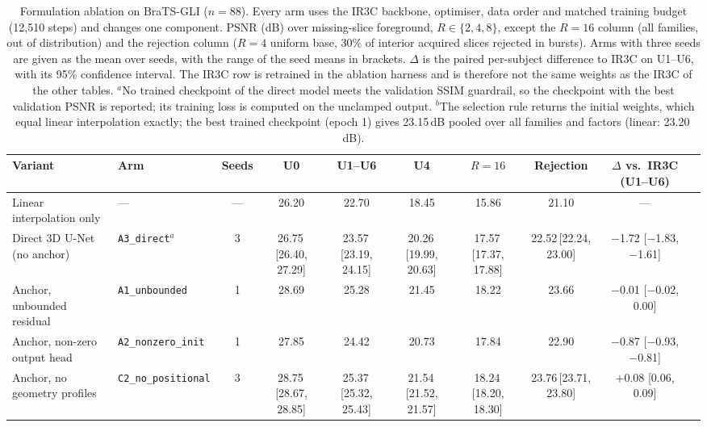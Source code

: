 \begin{table}[pos=t]
\caption{Formulation ablation on BraTS-GLI ($n=88$). Every arm uses the IR3C backbone, optimiser, data order and matched training budget (12,510 steps) and changes one component. PSNR (dB) over missing-slice foreground, $R\in\{2,4,8\}$, except the $R=16$ column (all families, out of distribution) and the rejection column ($R=4$ uniform base, 30\% of interior acquired slices rejected in bursts). Arms with three seeds are given as the mean over seeds, with the range of the seed means in brackets. $\Delta$ is the paired per-subject difference to IR3C on U1--U6, with its 95\% confidence interval. The IR3C row is retrained in the ablation harness and is therefore not the same weights as the IR3C of the other tables. $^{a}$No trained checkpoint of the direct model meets the validation SSIM guardrail, so the checkpoint with the best validation PSNR is reported; its training loss is computed on the unclamped output. $^{b}$The selection rule returns the initial weights, which equal linear interpolation exactly; the best trained checkpoint (epoch 1) gives 23.15\,dB pooled over all families and factors (linear: 23.20\,dB).}
\label{tab:formulation}
\footnotesize\setlength{\tabcolsep}{3pt}
\begin{tabular*}{\textwidth}{@{\extracolsep{\fill}}llcccccccc@{}}
\toprule
Variant & Arm & Seeds & U0 & U1--U6 & U4 & $R=16$ & Rejection & $\Delta$ vs.\ IR3C (U1--U6) \\
\midrule
Linear interpolation only & --- & --- & 26.20 & 22.70 & 18.45 & 15.86 & 21.10 & --- \\
Direct 3D U-Net (no anchor) & \texttt{A3\_direct}$^{a}$ & 3 & 26.75\,{\scriptsize[26.40, 27.29]} & 23.57\,{\scriptsize[23.19, 24.15]} & 20.26\,{\scriptsize[19.99, 20.63]} & 17.57\,{\scriptsize[17.37, 17.88]} & 22.52\,{\scriptsize[22.24, 23.00]} & $-$1.72 [$-$1.83, $-$1.61] \\
Anchor, unbounded residual & \texttt{A1\_unbounded} & 1 & 28.69 & 25.28 & 21.45 & 18.22 & 23.66 & $-$0.01 [$-$0.02, 0.00] \\
Anchor, non-zero output head & \texttt{A2\_nonzero\_init} & 1 & 27.85 & 24.42 & 20.73 & 17.84 & 22.90 & $-$0.87 [$-$0.93, $-$0.81] \\
Anchor, no geometry profiles & \texttt{C2\_no\_positional} & 3 & 28.75\,{\scriptsize[28.67, 28.85]} & 25.37\,{\scriptsize[25.32, 25.43]} & 21.54\,{\scriptsize[21.52, 21.57]} & 18.24\,{\scriptsize[18.20, 18.30]} & 23.76\,{\scriptsize[23.71, 23.80]} & $+$0.08 [0.06, 0.09] \\

\end{tabular*}
\end{table}
